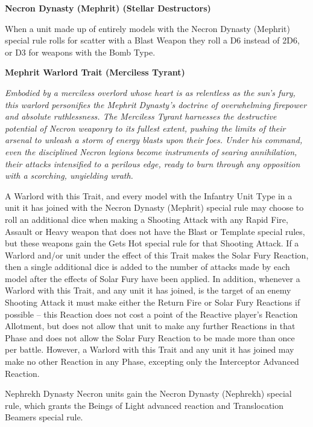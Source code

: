 \begin{multicols}{2}
	\textbf{Necron Dynasty (Mephrit) (Stellar Destructors)} 
	
	When a unit made up of entirely models with the Necron Dynasty (Mephrit) special rule rolls for scatter with a Blast Weapon they roll a D6 instead of 2D6, or D3 for weapons with the Bomb Type.
	
	\textbf{Mephrit Warlord Trait (Merciless Tyrant)}
	
	\textit{Embodied by a merciless overlord whose heart is as relentless as the sun's fury, this warlord personifies the Mephrit Dynasty’s doctrine of overwhelming firepower and absolute ruthlessness. The Merciless Tyrant harnesses the destructive potential of Necron weaponry to its fullest extent, pushing the limits of their arsenal to unleash a storm of energy blasts upon their foes. Under his command, even the disciplined Necron legions become instruments of searing annihilation, their attacks intensified to a perilous edge, ready to burn through any opposition with a scorching, unyielding wrath.}
	
	A Warlord with this Trait, and every model with the Infantry Unit Type in a unit it has joined with the Necron Dynasty (Mephrit) special rule may choose to roll an additional dice when making a Shooting Attack with any Rapid Fire, Assault or Heavy weapon that does not have the Blast or Template special rules, but these weapons gain the Gets Hot special rule for that Shooting Attack. If a Warlord and/or unit under the effect of this Trait makes the Solar Fury Reaction, then a single additional dice is added to the number of attacks made by each model after the effects of Solar Fury have been applied. In addition, whenever a Warlord with this Trait, and any unit it has joined, is the target of an enemy Shooting Attack it must make either the Return Fire or Solar Fury Reactions if possible – this Reaction does not cost a point of the Reactive player’s Reaction Allotment, but does not allow that unit to make any further Reactions in that Phase and does not allow the Solar Fury Reaction to be made more than once per battle. However, a Warlord with this Trait and any unit it has joined may make no other Reaction in any Phase, excepting only the Interceptor Advanced Reaction.
\end{multicols}


\newpage
{}

Nephrekh Dynasty Necron units gain the Necron Dynasty (Nephrekh) special rule, which grants the Beings of Light advanced reaction and Translocation Beamers special rule.

